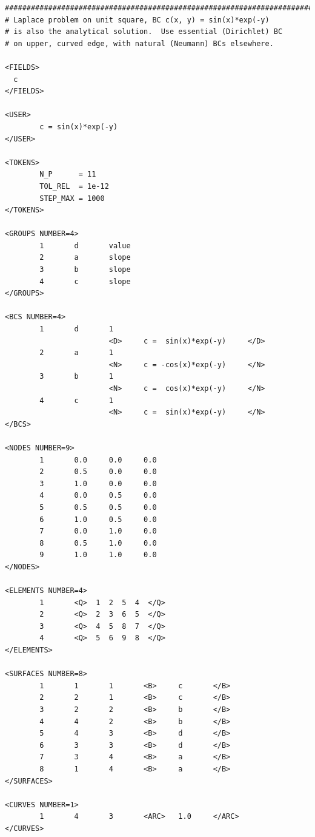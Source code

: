 \documentclass[11pt]{report}
\begin{document}
{\small
\begin{verbatim}
##############################################################################
# Laplace problem on unit square, BC c(x, y) = sin(x)*exp(-y)
# is also the analytical solution.  Use essential (Dirichlet) BC
# on upper, curved edge, with natural (Neumann) BCs elsewhere.

<FIELDS>
  c
</FIELDS>

<USER>
        c = sin(x)*exp(-y)
</USER>

<TOKENS>
        N_P      = 11
        TOL_REL  = 1e-12
        STEP_MAX = 1000
</TOKENS>

<GROUPS NUMBER=4>
        1       d       value
        2       a       slope
        3       b       slope
        4       c       slope
</GROUPS>

<BCS NUMBER=4>
        1       d       1
                        <D>     c =  sin(x)*exp(-y)     </D>
        2       a       1
                        <N>     c = -cos(x)*exp(-y)     </N>
        3       b       1
                        <N>     c =  cos(x)*exp(-y)     </N>
        4       c       1
                        <N>     c =  sin(x)*exp(-y)     </N>
</BCS>

<NODES NUMBER=9>
        1       0.0     0.0     0.0
        2       0.5     0.0     0.0
        3       1.0     0.0     0.0
        4       0.0     0.5     0.0
        5       0.5     0.5     0.0
        6       1.0     0.5     0.0
        7       0.0     1.0     0.0
        8       0.5     1.0     0.0
        9       1.0     1.0     0.0
</NODES>

<ELEMENTS NUMBER=4>
        1       <Q>  1  2  5  4  </Q>
        2       <Q>  2  3  6  5  </Q>
        3       <Q>  4  5  8  7  </Q>
        4       <Q>  5  6  9  8  </Q>
</ELEMENTS>

<SURFACES NUMBER=8>
        1       1       1       <B>     c       </B>
        2       2       1       <B>     c       </B>
        3       2       2       <B>     b       </B>
        4       4       2       <B>     b       </B>
        5       4       3       <B>     d       </B>
        6       3       3       <B>     d       </B>
        7       3       4       <B>     a       </B>
        8       1       4       <B>     a       </B>
</SURFACES>

<CURVES NUMBER=1>
        1       4       3       <ARC>   1.0     </ARC>
</CURVES>
\end{verbatim}
}
\end{document}
